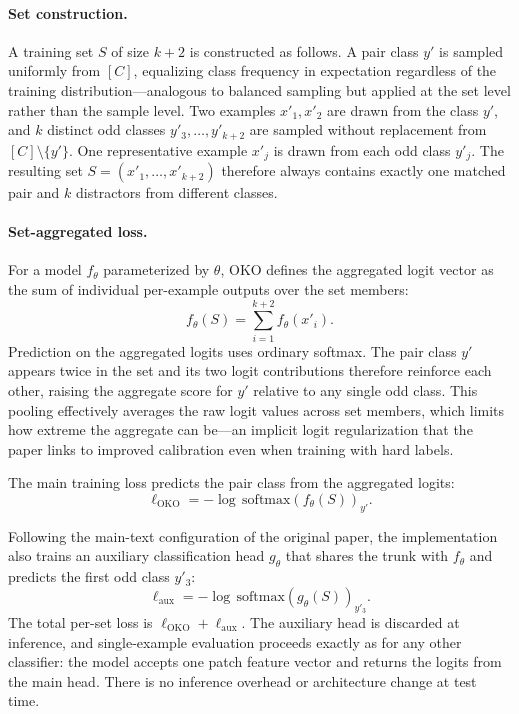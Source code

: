 \documentclass[11pt]{article}
\begin{document}
\paragraph{Set construction.}
A training set $S$ of size $k+2$ is constructed as follows. A pair class $y'$ is sampled uniformly from $[C]$, equalizing class frequency in expectation regardless of the training distribution---analogous to balanced sampling but applied at the set level rather than the sample level. Two examples $x'_1,x'_2$ are drawn from the class $y'$, and $k$ distinct odd classes $y'_3,\ldots,y'_{k+2}$ are sampled without replacement from $[C]\setminus\{y'\}$. One representative example $x'_{j}$ is drawn from each odd class $y'_j$. The resulting set $S=(x'_1,\ldots,x'_{k+2})$ therefore always contains exactly one matched pair and $k$ distractors from different classes.

\paragraph{Set-aggregated loss.}
For a model $f_\theta$ parameterized by $\theta$, OKO defines the aggregated logit vector as the sum of individual per-example outputs over the set members:
\begin{equation}
  f_\theta(S) = \sum_{i=1}^{k+2} f_\theta(x'_i).
  \label{eq:oko-aggregate}
\end{equation}
\noindent Prediction on the aggregated logits uses ordinary softmax. The pair class $y'$ appears twice in the set and its two logit contributions therefore reinforce each other, raising the aggregate score for $y'$ relative to any single odd class. This pooling effectively averages the raw logit values across set members, which limits how extreme the aggregate can be---an implicit logit regularization that the paper links to improved calibration even when training with hard labels.

The main training loss predicts the pair class from the aggregated logits:
\begin{equation}
  \ell_{\mathrm{OKO}} = -\log\,\mathrm{softmax}(f_\theta(S))_{y'}.
  \label{eq:oko-hard-loss}
\end{equation}

Following the main-text configuration of the original paper, the implementation also trains an auxiliary classification head $g_\theta$ that shares the trunk with $f_\theta$ and predicts the first odd class $y'_3$:
\begin{equation}
  \ell_{\mathrm{aux}} = -\log\,\mathrm{softmax}(g_\theta(S))_{y'_3}.
  \label{eq:oko-aux-loss}
\end{equation}
\noindent The total per-set loss is $\ell_{\mathrm{OKO}}+\ell_{\mathrm{aux}}$. The auxiliary head is discarded at inference, and single-example evaluation proceeds exactly as for any other classifier: the model accepts one patch feature vector and returns the logits from the main head. There is no inference overhead or architecture change at test time.
\end{document}
